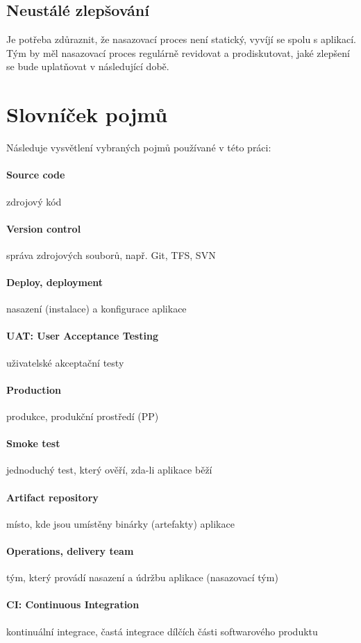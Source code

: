 \subsection{Neustálé zlepšování}
Je potřeba zdůraznit, že nasazovací proces není statický, vyvíjí se spolu s aplikací. Tým by měl nasazovací proces regulárně revidovat a prodiskutovat, jaké zlepšení se bude uplatňovat v následující době.

\section{Slovníček pojmů}
\label{pojmy}
Následuje vysvětlení vybraných pojmů používané v této práci:

\paragraph{Source code} zdrojový kód
\paragraph{Version control} správa zdrojových souborů, např. Git, TFS, SVN
\paragraph{Deploy, deployment} nasazení (instalace) a konfigurace aplikace
\paragraph{UAT: User Acceptance Testing} uživatelské akceptační testy
\paragraph{Production} produkce, produkční prostředí (PP)
\paragraph{Smoke test} jednoduchý test, který ověří, zda-li aplikace běží
\paragraph{Artifact repository} místo, kde jsou umístěny binárky (artefakty) aplikace
\paragraph{Operations, delivery team} tým, který provádí nasazení a údržbu aplikace (nasazovací tým)
\paragraph{CI: Continuous Integration} kontinuální integrace, častá integrace dílčích části softwarového produktu

